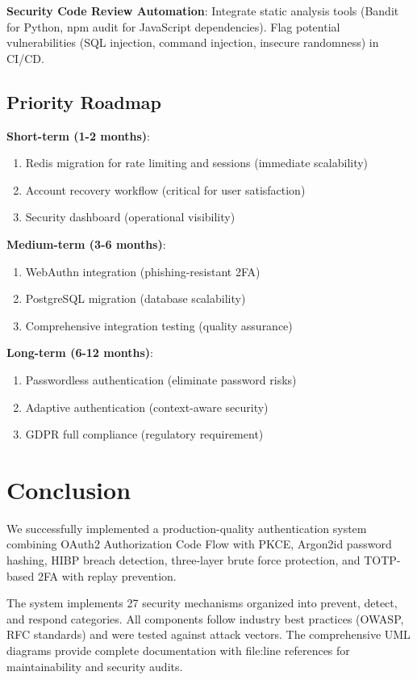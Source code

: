 \documentclass[12pt,a4paper]{article}
\begin{document}
\textbf{Security Code Review Automation}: Integrate static analysis tools (Bandit for Python, npm audit for JavaScript dependencies). Flag potential vulnerabilities (SQL injection, command injection, insecure randomness) in CI/CD.

\subsection{Priority Roadmap}

\textbf{Short-term (1-2 months)}:
\begin{enumerate}
    \item Redis migration for rate limiting and sessions (immediate scalability)
    \item Account recovery workflow (critical for user satisfaction)
    \item Security dashboard (operational visibility)
\end{enumerate}

\textbf{Medium-term (3-6 months)}:
\begin{enumerate}
    \item WebAuthn integration (phishing-resistant 2FA)
    \item PostgreSQL migration (database scalability)
    \item Comprehensive integration testing (quality assurance)
\end{enumerate}

\textbf{Long-term (6-12 months)}:
\begin{enumerate}
    \item Passwordless authentication (eliminate password risks)
    \item Adaptive authentication (context-aware security)
    \item GDPR full compliance (regulatory requirement)
\end{enumerate}

\section{Conclusion}

We successfully implemented a production-quality authentication system combining OAuth2 Authorization Code Flow with PKCE, Argon2id password hashing, HIBP breach detection, three-layer brute force protection, and TOTP-based 2FA with replay prevention.

The system implements 27 security mechanisms organized into prevent, detect, and respond categories. All components follow industry best practices (OWASP, RFC standards) and were tested against attack vectors. The comprehensive UML diagrams provide complete documentation with file:line references for maintainability and security audits.
\end{document}
